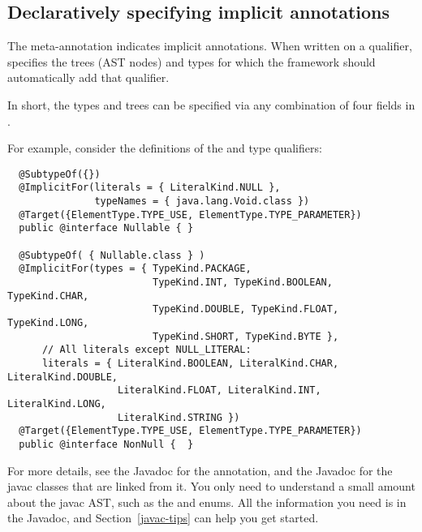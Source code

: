 \subsection{Declaratively specifying implicit annotations\label{declarative-type-introduction}}

The  meta-annotation indicates
implicit annotations.
When written on a qualifier, 
specifies the trees (AST nodes) and types for which the framework should
automatically add that qualifier.

In short, the types and trees can be
specified via any combination of four fields in .

For example, consider the definitions of the
 and
type qualifiers:

\begin{smaller}
\begin{Verbatim}
  @SubtypeOf({})
  @ImplicitFor(literals = { LiteralKind.NULL },
               typeNames = { java.lang.Void.class })
  @Target({ElementType.TYPE_USE, ElementType.TYPE_PARAMETER})
  public @interface Nullable { }

  @SubtypeOf( { Nullable.class } )
  @ImplicitFor(types = { TypeKind.PACKAGE,
                         TypeKind.INT, TypeKind.BOOLEAN, TypeKind.CHAR,
                         TypeKind.DOUBLE, TypeKind.FLOAT, TypeKind.LONG,
                         TypeKind.SHORT, TypeKind.BYTE },
      // All literals except NULL_LITERAL:
      literals = { LiteralKind.BOOLEAN, LiteralKind.CHAR, LiteralKind.DOUBLE,
                   LiteralKind.FLOAT, LiteralKind.INT, LiteralKind.LONG,
                   LiteralKind.STRING })
  @Target({ElementType.TYPE_USE, ElementType.TYPE_PARAMETER})
  public @interface NonNull {  }
\end{Verbatim}
\end{smaller}

For more details, see the Javadoc for the 
annotation, and the Javadoc for the javac classes that are linked from
it.  You only need to understand a small amount about the javac AST, such
as the
\href{\TreeAPIBase{}/tree/Tree.Kind.html?is-external=true}{}
and
enums.  All the information you need is in the Javadoc, and
Section~\ref{javac-tips} can help you get started.


